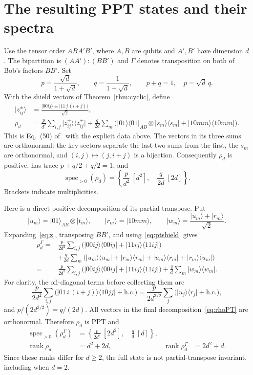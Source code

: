 \documentclass[11pt]{article}
\newcommand{\ket}[1]{\lvert #1\rangle}
\newcommand{\bra}[1]{\langle #1\rvert}
\newcommand{\proj}[1]{\ket{#1}\bra{#1}}
\newcommand{\rank}{\operatorname{rank}}
\begin{document}
\section{The resulting PPT states and their spectra}

Use the tensor order $ABA'B'$, where $A,B$ are qubits and $A',B'$ have
dimension $d$. The bipartition is $(AA'):(BB')$ and $\Gamma$ denotes
transposition on both of Bob's factors $BB'$.
Set
\[
 p=\frac{\sqrt d}{1+\sqrt d},\qquad
 q=\frac1{1+\sqrt d},\qquad p+q=1,\quad p=\sqrt d\,q.
\]
With the shield vectors of Theorem~\ref{thm:cyclic}, define
\begin{align}
 \ket{z_{ij}^{\pm}}&=
    \frac{\ket{00ij}\pm\ket{11\,j\,(i+j)}}{\sqrt2},\label{eq:z}\\
 \rho_d&=\frac{p}{d^2}\sum_{i,j}\proj{z_{ij}^{+}}
  +\frac{q}{2d}\sum_m
       \bigl(\proj{01}_{AB}\otimes\proj{s_m}
                     +\proj{10mm}\bigr).\label{eq:rho}
\end{align}
This is Eq.\ (50) of~\cite{Pal2021} with the explicit data above.
The vectors in its three sums are orthonormal: the key sectors separate
the last two sums from the first, the $s_m$ are orthonormal, and
$(i,j)\mapsto(j,i+j)$ is a bijection. Consequently $\rho_d$ is positive,
has trace $p+q/2+q/2=1$, and
\begin{equation}\label{eq:spectrum}
 \operatorname{spec}_{>0}(\rho_d)=
 \left\{\frac{p}{d^2}\ [d^2],\quad\frac{q}{2d}\ [2d]\right\}.
\end{equation}
Brackets indicate multiplicities.

Here is a direct positive decomposition of its partial transpose.
Put
\[
 \ket{u_m}=\ket{01}_{AB}\otimes\ket{t_m},\qquad
 \ket{r_m}=\ket{10mm},\qquad
 \ket{w_m}=\frac{\ket{u_m}+\ket{r_m}}{\sqrt2}.
\]
Expanding~\eqref{eq:z}, transposing $BB'$, and
using~\eqref{eq:ptshield} gives
\begin{align}
 \rho_d^\Gamma={}&\frac{p}{2d^2}\sum_{i,j}
       \bigl(\proj{00ij}+\proj{11ij}\bigr)\nonumber\\
 &+\frac{q}{2d}\sum_m
       \bigl(\proj{u_m}+\proj{r_m}
             +\ket{u_m}\bra{r_m}+\ket{r_m}\bra{u_m}\bigr)\nonumber\\
 ={}&\frac{p}{2d^2}\sum_{i,j}
       \bigl(\proj{00ij}+\proj{11ij}\bigr)
      +\frac qd\sum_m\proj{w_m}.\label{eq:rhoPT}
\end{align}
For clarity, the off-diagonal terms before collecting them are
\[
 \frac{p}{2d^2}\sum_{i,j}
 \bigl(\ket{01\,i\,(i+j)}\bra{10jj}+\mathrm{h.c.}\bigr)
 =\frac{p}{2d^{3/2}}\sum_j
       \bigl(\ket{u_j}\bra{r_j}+\mathrm{h.c.}\bigr),
\]
and $p/(2d^{3/2})=q/(2d)$. All vectors in the final
decomposition~\eqref{eq:rhoPT} are orthonormal. Therefore $\rho_d$ is PPT and
\begin{align}
 \operatorname{spec}_{>0}(\rho_d^\Gamma)
   &=\left\{\frac{p}{2d^2}\ [2d^2],\quad\frac qd\ [d]\right\},\\
 \rank\rho_d&=d^2+2d, & \rank\rho_d^\Gamma&=2d^2+d.
 \label{eq:ranks}
\end{align}
Since these ranks differ for $d\geq2$, the full state is not
partial-transpose invariant, including when $d=2$.
\end{document}
